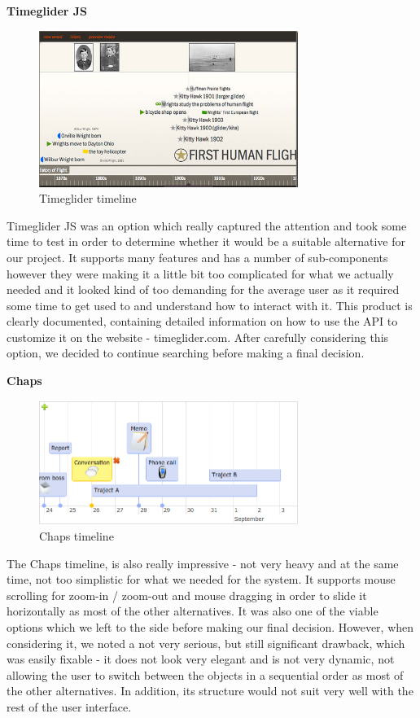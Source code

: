 \documentclass{l3proj}
\begin{document}
\textbf{Timeglider JS}

\begin{figure}[ht!]
  \centering
\includegraphics[width=0.75\textwidth]{images/Timeglider.png}
\caption{Timeglider timeline}
\end{figure}

Timeglider JS was an option which really captured the attention and took some time to test in order to determine whether it would be a suitable alternative for our project. It supports many features and has a number of sub-components however they were making it a little bit too complicated for what we actually needed and it looked kind of too demanding for the average user as it required some time to get used to and understand how to interact with it. This product is clearly documented, containing detailed information on how to use the API to customize it on the website - timeglider.com. After carefully considering this option, we decided to continue searching before making a final decision.


\textbf{Chaps}

\begin{figure}[ht!]
  \centering
\includegraphics[width=0.75\textwidth]{images/Chaps.png}
\caption{Chaps timeline}
\end{figure}

The Chaps timeline, is also really impressive - not very heavy and at the same time, not too simplistic for what we needed for the system. It supports mouse scrolling for zoom-in / zoom-out and mouse dragging in order to slide it horizontally as most of the other alternatives. It was also one of the viable options which we left to the side before making our final decision. However, when considering it, we noted a not very serious, but still significant drawback, which was easily fixable - it does not look very elegant and is not very dynamic, not allowing the user to switch between the objects in a sequential order as most of the other alternatives. In addition, its structure would not suit very well with the rest of the user interface.
\end{document}
